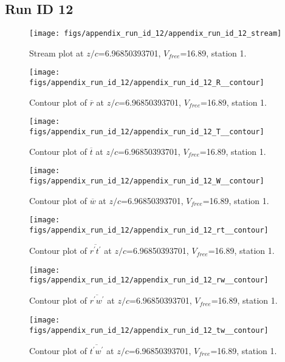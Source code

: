 \subsection{Run ID 12}
\begin{figure}[H]
\centering
\texttt{[image: figs/appendix\_run\_id\_12/appendix\_run\_id\_12\_stream]}
\caption{Stream plot at $z/c$=6.96850393701, $V_{free}$=16.89, station 1.}
\label{fig:appendix_run_id_12_stream}
\end{figure}


\begin{figure}[H]
\centering
\texttt{[image: figs/appendix\_run\_id\_12/appendix\_run\_id\_12\_R\_\_contour]}
\caption{Contour plot of $\overline{r}$ at $z/c$=6.96850393701, $V_{free}$=16.89, station 1.}
\label{fig:appendix_run_id_12_R__contour}
\end{figure}


\begin{figure}[H]
\centering
\texttt{[image: figs/appendix\_run\_id\_12/appendix\_run\_id\_12\_T\_\_contour]}
\caption{Contour plot of $\overline{t}$ at $z/c$=6.96850393701, $V_{free}$=16.89, station 1.}
\label{fig:appendix_run_id_12_T__contour}
\end{figure}


\begin{figure}[H]
\centering
\texttt{[image: figs/appendix\_run\_id\_12/appendix\_run\_id\_12\_W\_\_contour]}
\caption{Contour plot of $\overline{w}$ at $z/c$=6.96850393701, $V_{free}$=16.89, station 1.}
\label{fig:appendix_run_id_12_W__contour}
\end{figure}


\begin{figure}[H]
\centering
\texttt{[image: figs/appendix\_run\_id\_12/appendix\_run\_id\_12\_rt\_\_contour]}
\caption{Contour plot of $\overline{r^\prime t^\prime}$ at $z/c$=6.96850393701, $V_{free}$=16.89, station 1.}
\label{fig:appendix_run_id_12_rt__contour}
\end{figure}


\begin{figure}[H]
\centering
\texttt{[image: figs/appendix\_run\_id\_12/appendix\_run\_id\_12\_rw\_\_contour]}
\caption{Contour plot of $\overline{r^\prime w^\prime}$ at $z/c$=6.96850393701, $V_{free}$=16.89, station 1.}
\label{fig:appendix_run_id_12_rw__contour}
\end{figure}


\begin{figure}[H]
\centering
\texttt{[image: figs/appendix\_run\_id\_12/appendix\_run\_id\_12\_tw\_\_contour]}
\caption{Contour plot of $\overline{t^\prime w^\prime}$ at $z/c$=6.96850393701, $V_{free}$=16.89, station 1.}
\label{fig:appendix_run_id_12_tw__contour}
\end{figure}


